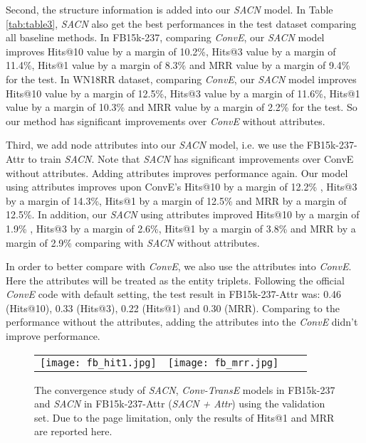 \documentclass[letterpaper]{article} \usepackage{aaai19}  \usepackage{times}  \usepackage{helvet}  \usepackage{courier}  \usepackage{url}  \usepackage{graphicx}  \usepackage{amsmath}
\begin{document}
Second, the structure information is added into our {\it SACN} model. In Table \ref{tab:table3}, {\it SACN} also get the best performances in the test dataset comparing all baseline methods. In FB15k-237, comparing {\it ConvE}, our {\it SACN} model improves Hits@10 value by a margin of 10.2\%, Hits@3 value by a margin of 11.4\%, Hits@1 value by a margin of 8.3\% and MRR value by a margin of 9.4\% for the test.
In WN18RR dataset, comparing {\it ConvE}, our {\it SACN} model improves Hits@10 value by a margin of 12.5\%, Hits@3 value by a margin of 11.6\%, Hits@1 value by a margin of 10.3\% and MRR value by a margin of 2.2\% for the test.
So our method has significant improvements over {\it ConvE} without attributes. 

Third, we add node attributes into our {\it SACN} model, i.e. we use the FB15k-237-Attr to train {\it SACN}. Note that {\it SACN} has significant improvements over ConvE without attributes. Adding attributes improves performance again. Our model using attributes improves upon ConvE's Hits@10 by a margin of 12.2\% , Hits@3 by a margin of 14.3\%, Hits@1 by a margin of 12.5\% and MRR by a margin of 12.5\%. 
In addition, our {\it SACN} using attributes improved Hits@10 by a margin of 1.9\% , Hits@3 by a margin of 2.6\%, Hits@1 by a margin of 3.8\% and MRR by a margin of 2.9\% comparing with {\it SACN} without attributes.

In order to better compare with {\it ConvE}, we also use the attributes into {\it ConvE}. Here the attributes will be treated as the entity triplets. Following the official {\it ConvE} code with default setting, the test result in FB15k-237-Attr was: 0.46 (Hits@10), 0.33 (Hits@3), 0.22 (Hits@1) and 0.30 (MRR).
Comparing to the performance without the attributes, adding the attributes into the {\it ConvE} didn't improve performance. 


\begin{figure}[htb]
\centering
  \begin{tabular}{@{}cccc@{}}
    \texttt{[image: fb\_hit1.jpg]} &
    \texttt{[image: fb\_mrr.jpg]}   \\
  \end{tabular}
  \caption{The convergence study of {\it SACN}, {\it Conv-TransE} models in FB15k-237 and {\it SACN} in FB15k-237-Attr ({\it SACN + Attr}) using the validation set. Due to the page limitation, only the results of Hits@1 and MRR are reported here.}
  \label{fig:fb15k-237-analysis}
\end{figure}
\end{document}
